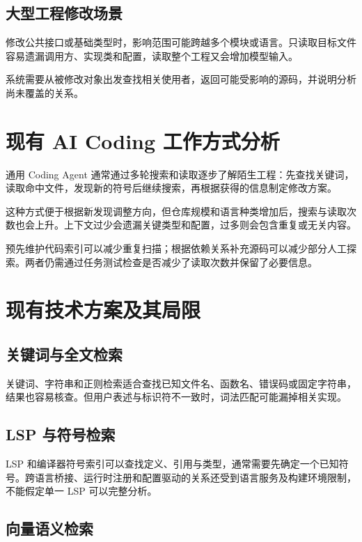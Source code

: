 \subsection{大型工程修改场景}

修改公共接口或基础类型时，影响范围可能跨越多个模块或语言。只读取目标文件容易遗漏调用方、实现类和配置，读取整个工程又会增加模型输入。

系统需要从被修改对象出发查找相关使用者，返回可能受影响的源码，并说明分析尚未覆盖的关系。

\section{现有 AI Coding 工作方式分析}

通用 Coding Agent 通常通过多轮搜索和读取逐步了解陌生工程：先查找关键词，读取命中文件，发现新的符号后继续搜索，再根据获得的信息制定修改方案。

这种方式便于根据新发现调整方向，但仓库规模和语言种类增加后，搜索与读取次数也会上升。上下文过少会遗漏关键类型和配置，过多则会包含重复或无关内容。

预先维护代码索引可以减少重复扫描；根据依赖关系补充源码可以减少部分人工探索。两者仍需通过任务测试检查是否减少了读取次数并保留了必要信息。

\section{现有技术方案及其局限}

\subsection{关键词与全文检索}

关键词、字符串和正则检索适合查找已知文件名、函数名、错误码或固定字符串，结果也容易核查。但用户表述与标识符不一致时，词法匹配可能漏掉相关实现。

\subsection{LSP 与符号检索}

LSP 和编译器符号索引可以查找定义、引用与类型，通常需要先确定一个已知符号。跨语言桥接、运行时注册和配置驱动的关系还受到语言服务及构建环境限制，不能假定单一 LSP 可以完整分析。

\subsection{向量语义检索}

